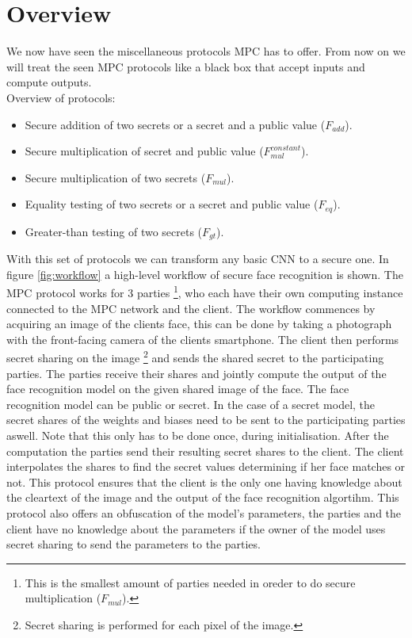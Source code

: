 \section{Overview}
We now have seen the miscellaneous protocols MPC has to offer. From now on we will treat the seen MPC protocols like a black box that accept inputs and compute outputs.\\
Overview of protocols:
\begin{itemize}
  \item Secure addition of two secrets or a secret and a public value ($F_{add}$).
  \item Secure multiplication of secret and public value ($F_{mul}^{constant}$).
  \item Secure multiplication of two secrets ($F_{mul}$).
  \item Equality testing of two secrets or a secret and public value ($F_{eq}$).
  \item Greater-than testing of two secrets ($F_{gt}$).
\end{itemize}

With this set of protocols we can transform any basic CNN to a secure one. In figure \ref{fig:workflow} a high-level workflow of secure face recognition is shown. The MPC protocol works for 3 parties \footnote{This is the smallest amount of parties needed in oreder to do secure multiplication ($F_{mul}$).}, who each have their own computing instance connected to the MPC network and the client. The workflow commences by acquiring an image of the clients face, this can be done by taking a photograph with the front-facing camera of the clients smartphone. The client then performs secret sharing on the image \footnote{Secret sharing is performed for each pixel of the image.} and sends the shared secret to the participating parties. The parties receive their shares and jointly compute the output of the face recognition model on the given shared image of the face. The face recognition model can be public or secret. In the case of a secret model, the secret shares of the weights and biases need to be sent to the participating parties aswell. Note that this only has to be done once, during initialisation. After the computation the parties send their resulting secret shares to the client. The client interpolates the shares to find the secret values determining if her face matches or not. This protocol ensures that the client is the only one having knowledge about the cleartext of the image and the output of the face recognition algortihm. This protocol also offers an obfuscation of the model's parameters, the parties and the client have no knowledge about the parameters if the owner of the model uses secret sharing to send the parameters to the parties.

